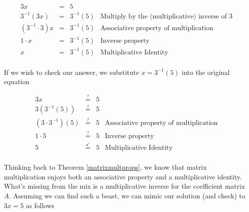 \documentclass{ximera}
\begin{document}
\[ \begin{array}{rclr}

3x & = & 5 \\
3^{-1}(3x) & = & 3^{-1}(5) & \text{Multiply by the (multiplicative) inverse of $3$} \\
\left(3^{-1}\cdot 3\right) x & = & 3^{-1}(5) & \text{Associative property of multiplication} \\
1 \cdot x &  = & 3^{-1}(5) & \text{Inverse property} \\
 x &  = & 3^{-1}(5) & \text{Multiplicative Identity} \\
 
\end{array} \]

If we wish to check our answer, we substitute $x = 3^{-1}(5)$ into the original equation

\[ \begin{array}{rclr}

3x & \stackrel{?}{=} & 5 \\
3\left( 3^{-1}(5)\right) & \stackrel{?}{=} & 5 \\
\left(3 \cdot 3^{-1}\right)(5) & \stackrel{?}{=} & 5 & \text{Associative property of multiplication}  \\
1 \cdot 5 & \stackrel{?}{=} & 5 & \text{Inverse property} \\
5 & \stackrel{\checkmark}{=} & 5 & \text{Multiplicative Identity} \\
\end{array} \]

Thinking back to Theorem \ref{matrixmultprops}, we know that matrix multiplication enjoys both an associative property and a multiplicative identity.  What's missing from the mix is a multiplicative inverse for the coefficient matrix $A$.  Assuming we can find such a beast, we can mimic our solution (and check) to $3x=5$ as follows
\end{document}

